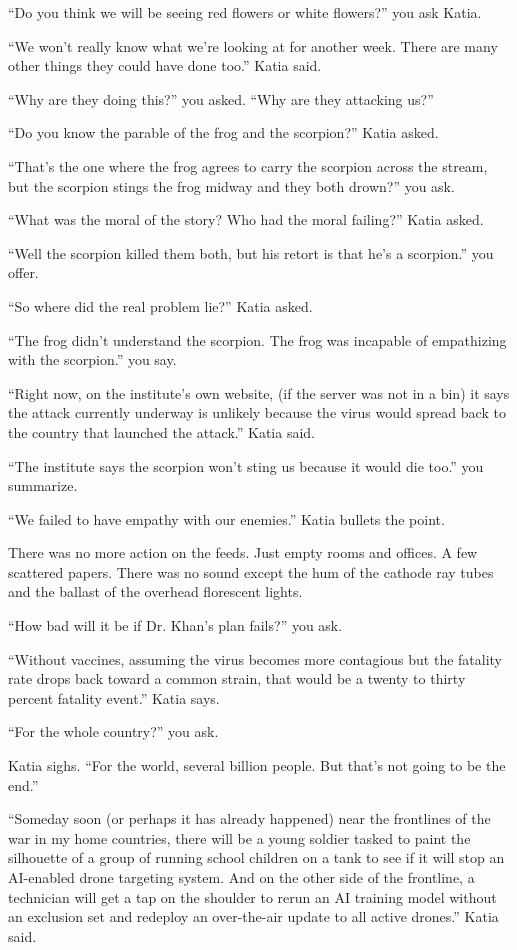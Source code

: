 \documentclass[17pt, twoside, a5paper, openright, extrafontsizes]{memoir}
\begin{document}
``Do you think we will be seeing red flowers or white flowers?'' you ask
Katia.

``We won't really know what we're looking at for another week. There are
many other things they could have done too.'' Katia said.

``Why are they doing this?'' you asked. ``Why are they attacking us?''

``Do you know the parable of the frog and the scorpion?'' Katia asked.

``That's the one where the frog agrees to carry the scorpion across the
stream, but the scorpion stings the frog midway and they both drown?''
you ask.

``What was the moral of the story? Who had the moral failing?'' Katia
asked.

``Well the scorpion killed them both, but his retort is that he's a
scorpion.'' you offer.

``So where did the real problem lie?'' Katia asked.

``The frog didn't understand the scorpion. The frog was incapable of
empathizing with the scorpion.'' you say.

``Right now, on the institute's own website, (if the server was not in a
bin) it says the attack currently underway is unlikely because the virus
would spread back to the country that launched the attack.'' Katia said.

``The institute says the scorpion won't sting us because it would die
too.'' you summarize.

``We failed to have empathy with our enemies.'' Katia bullets the point.

There was no more action on the feeds. Just empty rooms and offices. A
few scattered papers. There was no sound except the hum of the cathode
ray tubes and the ballast of the overhead florescent lights.

``How bad will it be if Dr. Khan's plan fails?'' you ask.

``Without vaccines, assuming the virus becomes more contagious but the
fatality rate drops back toward a common strain, that would be a twenty
to thirty percent fatality event.'' Katia says.

``For the whole country?'' you ask.

Katia sighs. ``For the world, several billion people. But that's not
going to be the end.''

``Someday soon (or perhaps it has already happened) near the frontlines
of the war in my home countries, there will be a young soldier tasked to
paint the silhouette of a group of running school children on a tank to
see if it will stop an AI-enabled drone targeting system. And on the
other side of the frontline, a technician will get a tap on the shoulder
to rerun an AI training model without an exclusion set and redeploy an
over-the-air update to all active drones.'' Katia said.
\end{document}
